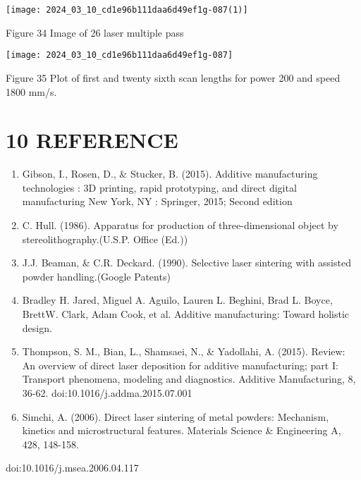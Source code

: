 \documentclass[10pt]{article}
\begin{document}
\begin{center}
\texttt{[image: 2024\_03\_10\_cd1e96b111daa6d49ef1g-087(1)]}
\end{center}

Figure 34 Image of 26 laser multiple pass

\begin{center}
\texttt{[image: 2024\_03\_10\_cd1e96b111daa6d49ef1g-087]}
\end{center}

Figure 35 Plot of first and twenty sixth scan lengths for power 200 and speed 1800 mm/s.

\section*{10 REFERENCE}
\begin{enumerate}
  \item Gibson, I., Rosen, D., \& Stucker, B. (2015). Additive manufacturing technologies : 3D printing, rapid prototyping, and direct digital manufacturing New York, NY : Springer, 2015; Second edition

  \item C. Hull. (1986). Apparatus for production of three-dimensional object by stereolithography.(U.S.P. Office (Ed.))

  \item J.J. Beaman, \& C.R. Deckard. (1990). Selective laser sintering with assisted powder handling.(Google Patents)

  \item Bradley H. Jared, Miguel A. Aguilo, Lauren L. Beghini, Brad L. Boyce, BrettW. Clark, Adam Cook, et al. Additive manufacturing: Toward holistic design.

  \item Thompson, S. M., Bian, L., Shamsaei, N., \& Yadollahi, A. (2015). Review: An overview of direct laser deposition for additive manufacturing; part I: Transport phenomena, modeling and diagnostics. Additive Manufacturing, 8, 36-62. doi:10.1016/j.addma.2015.07.001

  \item Simchi, A. (2006). Direct laser sintering of metal powders: Mechanism, kinetics and microstructural features. Materials Science \& Engineering A, 428, 148-158.

\end{enumerate}

doi:10.1016/j.msea.2006.04.117
\end{document}
